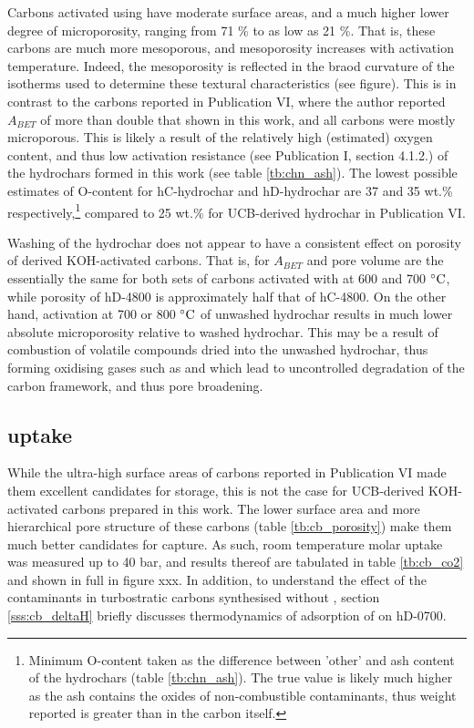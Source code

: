 Carbons activated using  have moderate surface areas, and a much higher lower degree of microporosity, ranging from 71 \% to as low as 21 \%. That is, these carbons are much more mesoporous, and mesoporosity increases with activation temperature. Indeed, the mesoporosity is reflected in the braod curvature of the  isotherms used to determine these textural characteristics (see figure). This is in contrast to the carbons reported in Publication VI, where the author reported $A_{BET}$ of more than double that shown in this work, and all carbons were mostly microporous. This is likely a result of the relatively high (estimated) oxygen content, and thus low activation resistance (see Publication I, section 4.1.2.) of the hydrochars formed in this work (see table \ref{tb:chn_ash}). The lowest possible estimates of O-content for hC-hydrochar and hD-hydrochar are 37 and 35 wt.\% respectively,\footnote{Minimum O-content taken as the difference between 'other' and ash content of the hydrochars (table \ref{tb:chn_ash}). The true value is likely much higher as the ash contains the oxides of non-combustible contaminants, thus weight reported is greater than in the carbon itself.} compared to 25 wt.\% for UCB-derived hydrochar in Publication VI. 

Washing of the hydrochar does not appear to have a consistent effect on porosity of derived KOH-activated carbons. That is, for $A_{BET}$ and pore volume are the essentially the same for both sets of carbons activated with  at 600 and 700 $\rm ^{\circ}C$, while porosity of hD-4800 is approximately half that of hC-4800. On the other hand, activation at 700 or 800 $\rm ^{\circ}C$ of unwashed hydrochar results in much lower absolute microporosity relative to washed hydrochar. This may be a result of combustion of volatile compounds dried into the unwashed hydrochar, thus forming oxidising gases such as  and  which lead to uncontrolled degradation of the carbon framework, and thus pore broadening.\citep{Sevilla2014Energy, Blankenship2022Modulating} 

\subsection{\texorpdfstring{ uptake}{CO2 uptake}}

While the ultra-high surface areas of carbons reported in Publication VI made them excellent candidates for  storage, this is not the case for UCB-derived KOH-activated carbons prepared in this work. The lower surface area and more hierarchical pore structure of these carbons (table \ref{tb:cb_porosity}) make them much better candidates for  capture. As such, room temperature molar  uptake was measured up to 40 bar, and results thereof are tabulated in table \ref{tb:cb_co2} and shown in full in figure xxx. In addition, to understand the effect of the contaminants in turbostratic carbons synthesised without , section \ref{sss:cb_deltaH} briefly discusses thermodynamics of adsorption of  on hD-0700.

